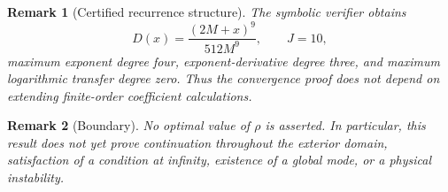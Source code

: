 \documentclass[11pt]{article}
\newtheorem{remark}{Remark}
\begin{document}
\begin{remark}[Certified recurrence structure]
The symbolic verifier obtains
\[
  D(x)=\frac{(2M+x)^9}{512M^9},
  \qquad J=10,
\]
maximum exponent degree four, exponent-derivative degree three, and
maximum logarithmic transfer degree zero.  Thus the convergence proof
does not depend on extending finite-order coefficient calculations.
\end{remark}

\begin{remark}[Boundary]
No optimal value of $\rho$ is asserted.  In particular, this result
does not yet prove continuation throughout the exterior domain,
satisfaction of a condition at infinity, existence of a global mode,
or a physical instability.
\end{remark}
\end{document}
